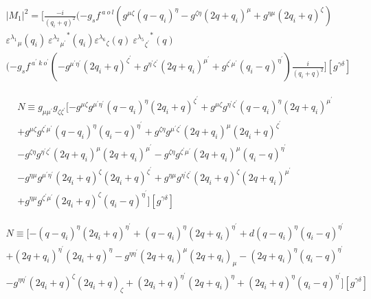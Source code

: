 \begin{equation}
\begin{split}
|M_1|^2=[\frac{-i}{(q_i +q)^2}(-g_s f^{\:a\:o\:l}(g^{{\mu}{\zeta}}(q-q_i)^{\eta}-g^{{\zeta}{\eta}}(2q +q_i)^{\mu}+g^{{\eta}{\mu}}(2q_i +q)^{\zeta})\\
{\varepsilon^{\lambda_1}}_{\mu} (q_i)\:{{\varepsilon^{\lambda_2}}_{{\mu}^{\prime}}}^* (q_i) {\varepsilon^{\lambda_6}}_{\zeta} (q)\:{{\varepsilon^{\lambda_5}}_{{\zeta}^{\prime}}}^* (q)\\
(-g_s f^{\:a^{\prime}\:k\:o^{\prime}}(-g^{{{\mu}^{\prime}}{{\eta}^{\prime}}}(2q_i+q)^{{\zeta}^{\prime}}+g^{{{\eta}^{\prime}}{{\zeta}^{\prime}}}(2q +q_i)^{{\mu}^{\prime}}+g^{{{\zeta}^{\prime}}{{\mu}^{\prime}}}(q_i-q)^{{\eta}^{\prime}})\frac{i}{(q_i +q)^2}][g^{{\gamma}{\delta}}]
\end{split}
\end{equation}

\begin{equation}
\begin{split}
N\equiv g_{{\mu}{{\mu}^{\prime}}} g_{{\zeta}{{\zeta}^{\prime}}}[-g^{{\mu}{\zeta}}g^{{{\mu}^{\prime}}{{\eta}^{\prime}}}(q-q_i)^{{\eta}}(2q_i+q)^{{\zeta}^{\prime}}+g^{{\mu}{\zeta}}g^{{{\eta}^{\prime}}{{\zeta}^{\prime}}}(q-q_i)^{\eta}(2q +q_i)^{{\mu}^{\prime}}\\+g^{{\mu}{\zeta}}g^{{{\zeta}^{\prime}}{{\mu}^{\prime}}}(q-q_i)^{\eta}(q_i -q)^{{\eta}^{\prime}}+g^{{\zeta}{\eta}}g^{{{\mu}^{\prime}}{{\zeta}^{\prime}}}(2q +q_i)^{\mu}(2q_i+q)^{{\zeta}^{\prime}}\\
-g^{{\zeta}{\eta}}g^{{{\eta}^{\prime}}{{\zeta}^{\prime}}}(2q +q_i)^{\mu}(2q +q_i)^{{\mu}^{\prime}}-g^{{\zeta}{\eta}}g^{{{\zeta}^{\prime}}{{\mu}^{\prime}}}(2q +q_i)^{\mu}(q_i -q)^{{\eta}^{\prime}}\\
-g^{{\eta}{\mu}}g^{{{\mu}^{\prime}}{{\eta}^{\prime}}}(2q_i +q)^{\zeta}(2q_i+q)^{{\zeta}^{\prime}}+g^{{\eta}{\mu}}g^{{{\eta}^{\prime}}{{\zeta}^{\prime}}}(2q_i +q)^{\zeta}(2q +q_i)^{{\mu}^{\prime}}\\
+g^{{\eta}{\mu}}g^{{{\zeta}^{\prime}}{{\mu}^{\prime}}}(2q_i +q)^{\zeta}(q_i -q)^{{\eta}^{\prime}}][g^{{\gamma}{\delta}}]
\end{split}
\end{equation}


\begin{equation}
\begin{split}
N\equiv [-(q-q_i)^{{\eta}}(2q_i+q)^{{\eta}^{\prime}}+(q-q_i)^{\eta}(2q +q_i)^{{\eta}^{\prime}}+d(q-q_i)^{\eta}(q_i -q)^{{\eta}^{\prime}}\\+(2q +q_i)^{{\eta}^{\prime}}(2q_i+q)^{{\eta}}
-g^{{\eta}{{\eta}^{\prime}}}(2q +q_i)^{\mu}(2q +q_i)_{{\mu}}-(2q +q_i)^{\eta}(q_i -q)^{{\eta}^{\prime}}\\
-g^{{\eta}{{\eta}^{\prime}}}(2q_i +q)^{\zeta}(2q_i+q)_{{\zeta}}+(2q_i +q)^{{\eta}^{\prime}}(2q +q_i)^{{\eta}}
+(2q_i +q)^{\eta}(q_i -q)^{{\eta}^{\prime}}][g^{{\gamma}{\delta}}]
\end{split}
\end{equation}

